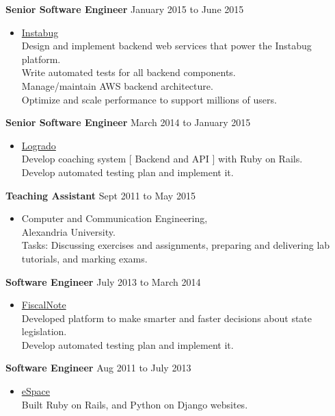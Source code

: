 \documentclass[10pt]{article}
\newenvironment{innerlist}[1][\enskip\textbullet]%
        {\begin{itemize}[#1,leftmargin=*,parsep=0pt,itemsep=0pt,topsep=0pt,partopsep=0pt]}
        {\end{itemize}}
\begin{document}
\textbf{Senior Software Engineer} \hfill {January 2015 to June 2015}
\begin{innerlist}
\item[] \href{https://instabug.com/}{Instabug}\\
        Design and implement backend web services that power the Instabug platform.\\
		Write automated tests for all backend components.\\
		Manage/maintain AWS backend architecture.\\
		Optimize and scale performance to support millions of users. 
\end{innerlist}

\textbf{Senior Software Engineer} \hfill {March 2014 to January 2015}
\begin{innerlist}
\item[] \href{http://app.logrado.com/}{Logrado}\\
        Develop coaching system [ Backend and API ] with Ruby on Rails.\\
        Develop automated testing plan and implement it.
\end{innerlist}

\vspace{+1mm}
\textbf{Teaching Assistant} \hfill {Sept 2011 to May 2015}
\begin{innerlist}
\item[] Computer and Communication Engineering,\\
        Alexandria University.\\
        Tasks: Discussing exercises and assignments, preparing and delivering lab tutorials, and marking exams.
\end{innerlist}

\vspace{+1mm}
\textbf{Software Engineer} \hfill {July 2013 to March 2014}
\begin{innerlist}	
\item[] \href{https://www.fiscalnote.com/}{FiscalNote}\\
	Developed platform to make smarter and faster decisions about state legislation.\\
    Develop automated testing plan and implement it.
\end{innerlist}

\vspace{+1mm}
\textbf{Software Engineer} \hfill {Aug 2011 to July 2013}
\begin{innerlist}	
\item[] \href{http://espace.com.eg/}{eSpace}\\
	Built Ruby on Rails, and Python on Django websites.
\end{innerlist}
\end{document}
